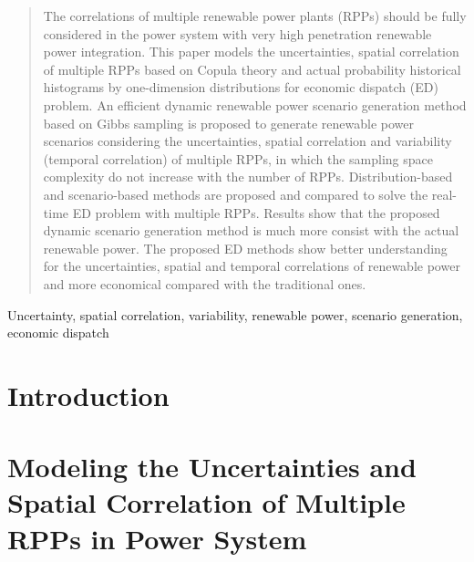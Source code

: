 \begin{abstract}
	The correlations of multiple renewable power plants (RPPs) should be fully considered in the power system with very high penetration renewable power integration. This paper models the uncertainties, spatial correlation of multiple RPPs based on Copula theory and actual probability historical histograms by one-dimension distributions for economic dispatch (ED) problem. An efficient dynamic renewable power scenario generation method based on Gibbs sampling is proposed to generate renewable power scenarios considering the uncertainties, spatial correlation and variability (temporal correlation) of multiple RPPs, in which the sampling space complexity do not increase with the number of RPPs. Distribution-based and scenario-based methods are proposed and compared to solve the real-time ED problem with multiple RPPs. Results show that the proposed dynamic scenario generation method is much more consist with the actual renewable power. The proposed ED methods show better understanding for the uncertainties, spatial and temporal correlations of renewable power and more economical compared with the traditional ones.
\end{abstract}

\begin{IEEEkeywords}
	Uncertainty, spatial correlation, variability, renewable power, scenario generation, economic dispatch
\end{IEEEkeywords}

%
\IEEEpeerreviewmaketitle




\section{Introduction}



\section {Modeling the Uncertainties and Spatial Correlation of Multiple RPPs in Power System}


